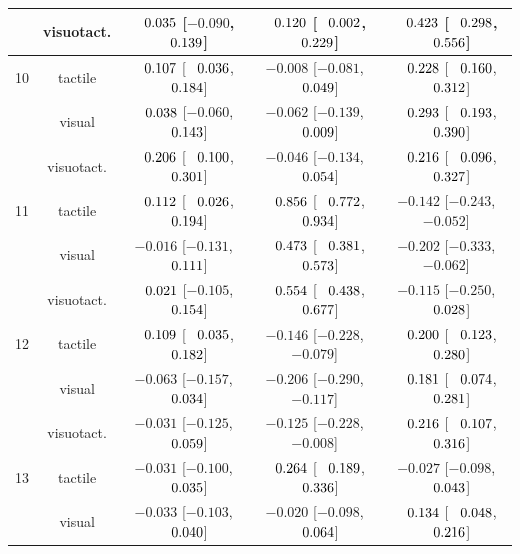 \begin{longtable}{lcccc}
 & visuotact. & $\hphantom{-}0.035$ [$-0.090$, $\hphantom{-}0.139$] & $\hphantom{-}0.120$ [$\hphantom{-}0.002$, $\hphantom{-}0.229$] & $\hphantom{-}0.423$ [$\hphantom{-}0.298$, $\hphantom{-}0.556$] \\
\midrule
10 & tactile & $\hphantom{-}0.107$ [$\hphantom{-}0.036$, $\hphantom{-}0.184$] & $-0.008$ [$-0.081$, $\hphantom{-}0.049$] & $\hphantom{-}0.228$ [$\hphantom{-}0.160$, $\hphantom{-}0.312$] \\
 & visual & $\hphantom{-}0.038$ [$-0.060$, $\hphantom{-}0.143$] & $-0.062$ [$-0.139$, $\hphantom{-}0.009$] & $\hphantom{-}0.293$ [$\hphantom{-}0.193$, $\hphantom{-}0.390$] \\
 & visuotact. & $\hphantom{-}0.206$ [$\hphantom{-}0.100$, $\hphantom{-}0.301$] & $-0.046$ [$-0.134$, $\hphantom{-}0.054$] & $\hphantom{-}0.216$ [$\hphantom{-}0.096$, $\hphantom{-}0.327$] \\
\midrule
11 & tactile & $\hphantom{-}0.112$ [$\hphantom{-}0.026$, $\hphantom{-}0.194$] & \cellcolor{gray!15}$\hphantom{-}0.856$ [$\hphantom{-}0.772$, $\hphantom{-}0.934$] & $-0.142$ [$-0.243$, $-0.052$] \\
 & visual & $-0.016$ [$-0.131$, $\hphantom{-}0.111$] & \cellcolor{gray!15}$\hphantom{-}0.473$ [$\hphantom{-}0.381$, $\hphantom{-}0.573$] & $-0.202$ [$-0.333$, $-0.062$] \\
 & visuotact. & $\hphantom{-}0.021$ [$-0.105$, $\hphantom{-}0.154$] & \cellcolor{gray!15}$\hphantom{-}0.554$ [$\hphantom{-}0.438$, $\hphantom{-}0.677$] & $-0.115$ [$-0.250$, $\hphantom{-}0.028$] \\
\midrule
12 & tactile & \cellcolor{gray!15}$\hphantom{-}0.109$ [$\hphantom{-}0.035$, $\hphantom{-}0.182$] & $-0.146$ [$-0.228$, $-0.079$] & $\hphantom{-}0.200$ [$\hphantom{-}0.123$, $\hphantom{-}0.280$] \\
 & visual & \cellcolor{gray!15}$-0.063$ [$-0.157$, $\hphantom{-}0.034$] & $-0.206$ [$-0.290$, $-0.117$] & $\hphantom{-}0.181$ [$\hphantom{-}0.074$, $\hphantom{-}0.281$] \\
 & visuotact. & \cellcolor{gray!15}$-0.031$ [$-0.125$, $\hphantom{-}0.059$] & $-0.125$ [$-0.228$, $-0.008$] & $\hphantom{-}0.216$ [$\hphantom{-}0.107$, $\hphantom{-}0.316$] \\
\midrule
13 & tactile & $-0.031$ [$-0.100$, $\hphantom{-}0.035$] & \cellcolor{gray!15}$\hphantom{-}0.264$ [$\hphantom{-}0.189$, $\hphantom{-}0.336$] & \cellcolor{gray!15}$-0.027$ [$-0.098$, $\hphantom{-}0.043$] \\
 & visual & $-0.033$ [$-0.103$, $\hphantom{-}0.040$] & \cellcolor{gray!15}$-0.020$ [$-0.098$, $\hphantom{-}0.064$] & \cellcolor{gray!15}$\hphantom{-}0.134$ [$\hphantom{-}0.048$, $\hphantom{-}0.216$] \\

\end{longtable}

